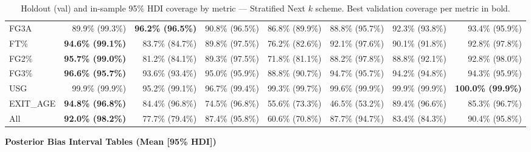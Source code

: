 \begin{table}[H]
{\begin{tabular}{lrrrrrrr}
FG3A & 89.9\% (99.3\%) & \textbf{96.2\% (96.5\%)} & 90.8\% (96.5\%) & 86.8\% (89.9\%) & 88.8\% (95.7\%) & 92.3\% (93.8\%) & 93.4\% (95.9\%) \\
FT\% & \textbf{94.6\% (99.1\%)} & 83.7\% (84.7\%) & 89.8\% (97.5\%) & 76.2\% (82.6\%) & 92.1\% (97.6\%) & 90.1\% (91.8\%) & 92.8\% (97.8\%) \\
FG2\% & \textbf{95.7\% (99.0\%)} & 81.2\% (84.1\%) & 89.3\% (97.5\%) & 71.8\% (81.1\%) & 88.2\% (97.8\%) & 88.8\% (92.1\%) & 92.8\% (98.0\%) \\
FG3\% & \textbf{96.6\% (95.7\%)} & 93.6\% (93.4\%) & 95.0\% (95.9\%) & 88.8\% (90.7\%) & 94.7\% (95.7\%) & 94.2\% (94.8\%) & 94.3\% (95.9\%) \\
USG & 99.9\% (99.9\%) & 95.2\% (99.1\%) & 96.7\% (99.4\%) & 99.3\% (99.7\%) & 99.6\% (99.9\%) & 99.9\% (99.9\%) & \textbf{100.0\% (99.9\%)} \\
EXIT\_AGE & \textbf{94.8\% (96.8\%)} & 84.4\% (96.8\%) & 74.5\% (96.8\%) & 55.6\% (73.3\%) & 46.5\% (53.2\%) & 89.4\% (96.6\%) & 85.3\% (96.7\%) \\
\midrule
All & \textbf{92.0\% (98.2\%)} & 77.7\% (79.4\%) & 87.4\% (95.8\%) & 60.6\% (70.8\%) & 87.7\% (94.7\%) & 83.4\% (84.3\%) & 90.4\% (95.8\%) \\
\bottomrule
\end{tabular}
}
\caption{Holdout (val) and in-sample 95\% HDI coverage by metric --- Stratified Next $k$ scheme. Best validation coverage per metric in bold.}
\label{tab:hdi_coverage_stratified_next_k}
\end{table}

\bigskip
{\centering\large\textbf{Posterior Bias Interval Tables (Mean [95\% HDI])}\\[4pt]}

